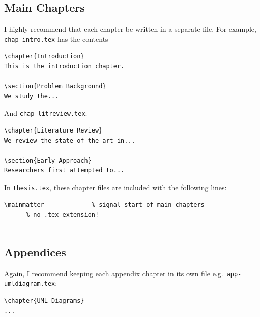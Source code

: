\subsection{Main Chapters}\label{sec:chapters}

I highly recommend that each chapter be written in a separate file. For example, \texttt{chap-intro.tex} has the contents

\begin{lstlisting}[moretexcs={chapter}]
\chapter{Introduction}
This is the introduction chapter.

\section{Problem Background}
We study the...
\end{lstlisting}


And \texttt{chap-litreview.tex}:

\begin{lstlisting}[moretexcs={chapter}]
\chapter{Literature Review}
We review the state of the art in...

\section{Early Approach}
Researchers first attempted to...
\end{lstlisting}


In \texttt{thesis.tex}, these chapter files are included with the following lines:

\begin{lstlisting}[keepspaces=true,moretexcs=mainmatter]
\mainmatter             % signal start of main chapters
      % no .tex extension!


\end{lstlisting}

\subsection{Appendices}\label{sec:appendices}
Again, I recommend keeping each appendix chapter in its own file e.g.~\texttt{app-umldiagram.tex}:

\begin{lstlisting}
\chapter{UML Diagrams}
...
\end{lstlisting}


